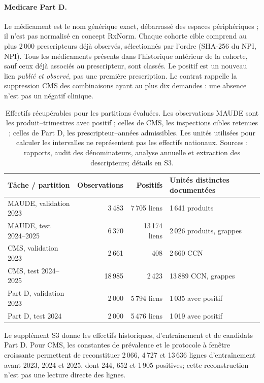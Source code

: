 \paragraph{Medicare Part D.} Le médicament est le nom générique exact, débarrassé des espaces périphériques ; il n'est pas normalisé en concept RxNorm. Chaque cohorte cible comprend au plus 2\,000 prescripteurs déjà observés, sélectionnés par l'ordre (SHA-256 du NPI, NPI). Tous les médicaments présents dans l'historique antérieur de la cohorte, sauf ceux déjà associés au prescripteur, sont classés. Le positif est un nouveau lien \emph{publié et observé}, pas une première prescription. Le contrat rappelle la suppression CMS des combinaisons ayant au plus dix demandes : une absence n'est pas un négatif clinique\cite{cmspartd,hgbpartd}.

\begin{table}[!htbp]
\centering\footnotesize
\caption{Effectifs récupérables pour les partitions évaluées. Les observations MAUDE sont les produit--trimestres avec positif ; celles de CMS, les inspections cibles retenues ; celles de Part D, les prescripteur--années admissibles. Les unités utilisées pour calculer les intervalles ne représentent pas les effectifs nationaux. Sources : rapports, audit des dénominateurs, analyse annuelle et extraction des descripteurs\cite{hgbresults,hgbanalysis,hgbpartd}; détails en S3.}
\label{tab:population}
\begin{tabularx}{\linewidth}{@{}lrrX@{}}
\toprule
Tâche / partition & Observations & Positifs & Unités distinctes documentées\\
\midrule
MAUDE, validation 2023 & 3\,483 & 7\,705 liens & 1\,641 produits\\
MAUDE, test 2024--2025 & 6\,370 & 13\,174 liens & 2\,026 produits, grappes\\
CMS, validation 2023 & 2\,661 & 408 & 2\,660 CCN\\
CMS, test 2024--2025 & 18\,985 & 2\,423 & 13\,889 CCN, grappes\\
Part D, validation 2023 & 2\,000 & 5\,794 liens & 1\,035 avec positif\\
Part D, test 2024 & 2\,000 & 5\,476 liens & 1\,019 avec positif\\
\bottomrule
\end{tabularx}
\end{table}

Le supplément S3 donne les effectifs historiques, d'entraînement et de candidats Part D. Pour CMS, les constantes de prévalence et le protocole à fenêtre croissante permettent de reconstituer 2\,066, 4\,727 et 13\,636 lignes d'entraînement avant 2023, 2024 et 2025, dont 244, 652 et 1\,905 positives; cette reconstruction n'est pas une lecture directe des lignes.


